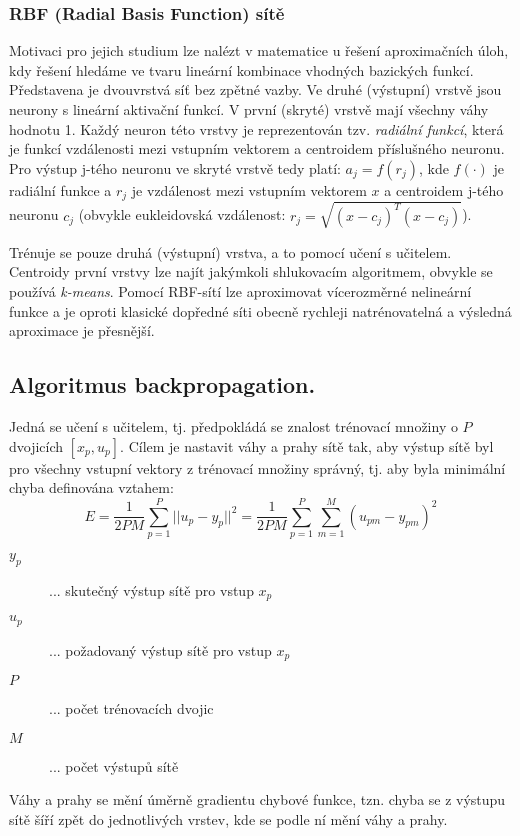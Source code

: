 \subsubsection*{RBF (Radial Basis Function) sítě}
Motivaci pro jejich studium lze nalézt v matematice u řešení aproximačních úloh, kdy řešení hledáme ve tvaru lineární kombinace vhodných bazických funkcí. Představena je dvouvrstvá síť bez zpětné vazby. Ve druhé (výstupní) vrstvě jsou neurony s lineární aktivační funkcí. V první (skryté) vrstvě mají všechny váhy hodnotu 1. Každý neuron této vrstvy je reprezentován tzv. \textit{radiální funkcí}, která je funkcí vzdálenosti mezi vstupním vektorem a centroidem příslušného neuronu. Pro výstup j-tého neuronu ve skryté vrstvě tedy platí: $ a_j = f(r_j) $, kde $ f(\cdot) $ je radiální funkce a $ r_j $ je vzdálenost mezi vstupním vektorem $ x $ a centroidem j-tého neuronu $ c_j $ (obvykle eukleidovská vzdálenost: $ r_j = \sqrt{(x-c_j)^T(x-c_j)} $).

Trénuje se pouze druhá (výstupní) vrstva, a to pomocí učení s učitelem. Centroidy první vrstvy lze najít jakýmkoli shlukovacím algoritmem, obvykle se používá \textit{k-means}. Pomocí RBF-sítí lze aproximovat vícerozměrné nelineární funkce a je oproti klasické dopředné síti obecně rychleji natrénovatelná a výsledná aproximace je přesnější.

\subsection{Algoritmus backpropagation.}
Jedná se učení s učitelem, tj. předpokládá se znalost trénovací množiny o $ P $ dvojicích $ [x_p, u_p] $. Cílem je nastavit váhy a prahy sítě tak, aby výstup sítě byl pro všechny vstupní vektory z trénovací množiny správný, tj. aby byla minimální chyba definována vztahem:
\begin{equation}
E = \frac{1}{2PM} \displaystyle{\sum_{p=1}^P} ||u_p-y_p||^2 = \frac{1}{2PM} \displaystyle{\sum_{p=1}^P \sum_{m=1}^M} (u_{pm}-y_{pm})^2
\end{equation}
\begin{description}
\item[$ y_p $] ... skutečný výstup sítě pro vstup $ x_p $
\item[$ u_p $] ... požadovaný výstup sítě pro vstup $ x_p $
\item[$ P $] ... počet trénovacích dvojic
\item[$ M $] ... počet výstupů sítě
\end{description}
Váhy a prahy se mění úměrně gradientu chybové funkce, tzn. chyba se z výstupu sítě šíří zpět do jednotlivých vrstev, kde se podle ní mění váhy a prahy.

